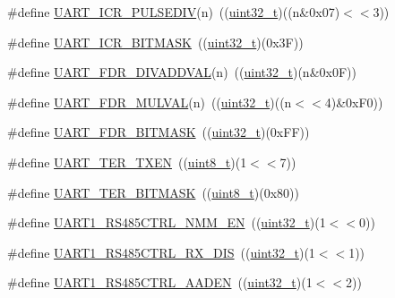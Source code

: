 \begin{DoxyCompactItemize}
\#define \hyperlink{group___u_a_r_t___private___macros_ga2c4fd2b4e5050b400349138942bfb307}{U\+A\+R\+T\+\_\+\+I\+C\+R\+\_\+\+P\+U\+L\+S\+E\+D\+IV}(n)~((\hyperlink{_p_e___types_8h_a33594304e786b158f3fb30289278f5af}{uint32\+\_\+t})((n\&0x07)$<$$<$3))
\item 
\#define \hyperlink{group___u_a_r_t___private___macros_ga822d618fad4a8a146fd8113f827b5d09}{U\+A\+R\+T\+\_\+\+I\+C\+R\+\_\+\+B\+I\+T\+M\+A\+SK}~((\hyperlink{_p_e___types_8h_a33594304e786b158f3fb30289278f5af}{uint32\+\_\+t})(0x3\+F))
\item 
\#define \hyperlink{group___u_a_r_t___private___macros_ga08ae53568f606c894a5ffd764cef6171}{U\+A\+R\+T\+\_\+\+F\+D\+R\+\_\+\+D\+I\+V\+A\+D\+D\+V\+AL}(n)~((\hyperlink{_p_e___types_8h_a33594304e786b158f3fb30289278f5af}{uint32\+\_\+t})(n\&0x0\+F))
\item 
\#define \hyperlink{group___u_a_r_t___private___macros_ga728a262cba31ffd0d7b4fb172f6dead7}{U\+A\+R\+T\+\_\+\+F\+D\+R\+\_\+\+M\+U\+L\+V\+AL}(n)~((\hyperlink{_p_e___types_8h_a33594304e786b158f3fb30289278f5af}{uint32\+\_\+t})((n$<$$<$4)\&0x\+F0))
\item 
\#define \hyperlink{group___u_a_r_t___private___macros_ga61a8f74c3fc22574793c6218b90fec50}{U\+A\+R\+T\+\_\+\+F\+D\+R\+\_\+\+B\+I\+T\+M\+A\+SK}~((\hyperlink{_p_e___types_8h_a33594304e786b158f3fb30289278f5af}{uint32\+\_\+t})(0x\+F\+F))
\item 
\#define \hyperlink{group___u_a_r_t___private___macros_gaa6e9b1099b787bb65c64d2e07d2fc3cf}{U\+A\+R\+T\+\_\+\+T\+E\+R\+\_\+\+T\+X\+EN}~((\hyperlink{_p_e___types_8h_aba7bc1797add20fe3efdf37ced1182c5}{uint8\+\_\+t})(1$<$$<$7))
\item 
\#define \hyperlink{group___u_a_r_t___private___macros_ga65bbbe4fecd3da46942b07267bf5cd32}{U\+A\+R\+T\+\_\+\+T\+E\+R\+\_\+\+B\+I\+T\+M\+A\+SK}~((\hyperlink{_p_e___types_8h_aba7bc1797add20fe3efdf37ced1182c5}{uint8\+\_\+t})(0x80))
\item 
\#define \hyperlink{group___u_a_r_t___private___macros_ga17e0186d392ae4cab45b95b94b325af9}{U\+A\+R\+T1\+\_\+\+R\+S485\+C\+T\+R\+L\+\_\+\+N\+M\+M\+\_\+\+EN}~((\hyperlink{_p_e___types_8h_a33594304e786b158f3fb30289278f5af}{uint32\+\_\+t})(1$<$$<$0))
\item 
\#define \hyperlink{group___u_a_r_t___private___macros_gad46c85dd9ed07459a63a886052e53404}{U\+A\+R\+T1\+\_\+\+R\+S485\+C\+T\+R\+L\+\_\+\+R\+X\+\_\+\+D\+IS}~((\hyperlink{_p_e___types_8h_a33594304e786b158f3fb30289278f5af}{uint32\+\_\+t})(1$<$$<$1))
\item 
\#define \hyperlink{group___u_a_r_t___private___macros_gacf6b20c310ad50b23669afbc56f0f005}{U\+A\+R\+T1\+\_\+\+R\+S485\+C\+T\+R\+L\+\_\+\+A\+A\+D\+EN}~((\hyperlink{_p_e___types_8h_a33594304e786b158f3fb30289278f5af}{uint32\+\_\+t})(1$<$$<$2))

\end{DoxyCompactItemize}
